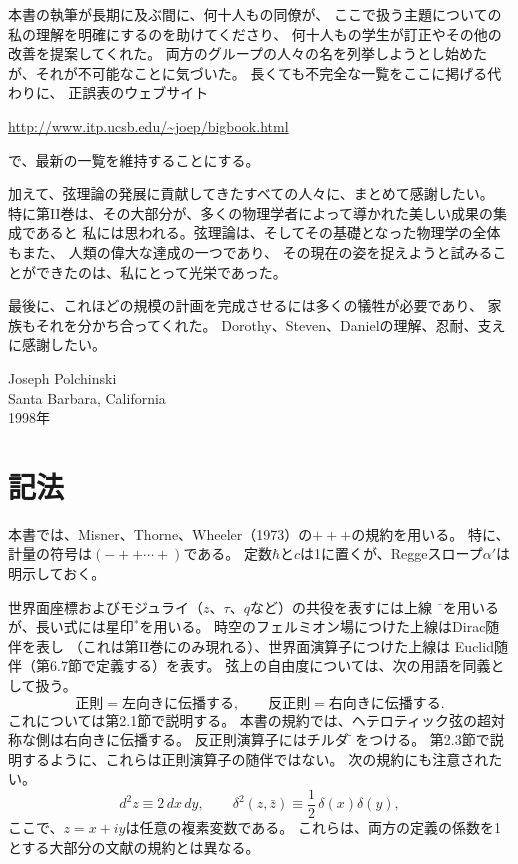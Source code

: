 本書の執筆が長期に及ぶ間に、何十人もの同僚が、
ここで扱う主題についての私の理解を明確にするのを助けてくださり、
何十人もの学生が訂正やその他の改善を提案してくれた。
両方のグループの人々の名を列挙しようとし始めたが、それが不可能なことに気づいた。
長くても不完全な一覧をここに掲げる代わりに、
正誤表のウェブサイト
\begin{center}
\url{http://www.itp.ucsb.edu/~joep/bigbook.html}
\end{center}
で、最新の一覧を維持することにする。

加えて、弦理論の発展に貢献してきたすべての人々に、まとめて感謝したい。
特に第II巻は、その大部分が、多くの物理学者によって導かれた美しい成果の集成であると
私には思われる。弦理論は、そしてその基礎となった物理学の全体もまた、
人類の偉大な達成の一つであり、
その現在の姿を捉えようと試みることができたのは、私にとって光栄であった。

最後に、これほどの規模の計画を完成させるには多くの犠牲が必要であり、
家族もそれを分かち合ってくれた。
Dorothy、Steven、Danielの理解、忍耐、支えに感謝したい。

\begin{flushright}
Joseph Polchinski\\
Santa Barbara, California\\
1998年
\end{flushright}

\clearpage
\section*{記法}
本書では、Misner、Thorne、Wheeler（1973）\cite{Misner:1973prb}の$+++$の規約を用いる。
特に、計量の符号は$(-++\cdots+)$である。
定数$\hbar$と$c$は1に置くが、Reggeスロープ$\alpha'$は明示しておく。

世界面座標およびモジュライ（$z$、$\tau$、$q$など）の共役を表すには上線
$\bar{\phantom{z}}$を用いるが、長い式には星印${}^{*}$を用いる。
時空のフェルミオン場につけた上線はDirac随伴を表し
（これは第II巻にのみ現れる）、世界面演算子につけた上線は
Euclid随伴（第6.7節で定義する）を表す。
弦上の自由度については、次の用語を同義として扱う。
\[
 \text{正則}=\text{左向きに伝播する},\qquad
 \text{反正則}=\text{右向きに伝播する}.
\]
これについては第2.1節で説明する。
本書の規約では、ヘテロティック弦の超対称な側は右向きに伝播する。
反正則演算子にはチルダ$\tilde{\phantom{z}}$をつける。
第2.3節で説明するように、これらは正則演算子の随伴ではない。
次の規約にも注意されたい。
\[
 d^{2}z\equiv 2\,dx\,dy,\qquad
 \delta^{2}(z,\bar z)\equiv\frac12\,\delta(x)\delta(y),
\]
ここで、$z=x+iy$は任意の複素変数である。
これらは、両方の定義の係数を1とする大部分の文献の規約とは異なる。


